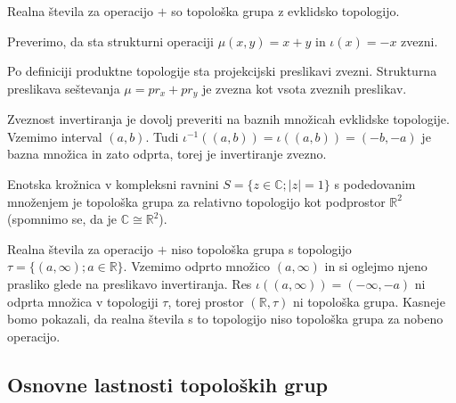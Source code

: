 \documentclass[mat1]{fmfdelo}
\newcommand{\R}{\mathbb R}
\newcommand{\C}{\mathbb C}
\begin{document}
\begin{primer}
	Realna števila za operacijo $+$ so topološka grupa z evklidsko topologijo.
	
	Preverimo, da sta strukturni operaciji $\mu(x, y) = x + y$ in $\iota(x) = -x$ zvezni.
	
	Po definiciji produktne topologije sta projekcijski preslikavi zvezni. Strukturna preslikava seštevanja $\mu = pr_x + pr_y$ je zvezna kot vsota zveznih preslikav.
	
	Zveznost invertiranja je dovolj preveriti na baznih množicah evklidske topologije. Vzemimo interval $(a, b)$. Tudi $\iota^{-1}((a, b)) = \iota((a, b)) = (-b, -a)$ je bazna množica in zato odprta, torej je invertiranje zvezno.
\end{primer}

\begin{primer}
	Enotska krožnica v kompleksni ravnini $S = \lbrace z \in \C ; |z| = 1 \rbrace$ s podedovanim množenjem je topološka grupa za relativno topologijo kot podprostor $\R^2$ (spomnimo se, da je $\C \cong \R^2$).
\end{primer}

\begin{primer}\label{pri:haus}
	Realna števila za operacijo $+$ niso topološka grupa s topologijo $\tau = \lbrace (a, \infty) ; a \in \R \rbrace$. Vzemimo odprto množico $(a, \infty)$ in si oglejmo njeno prasliko glede na preslikavo invertiranja. Res $\iota((a, \infty)) = (-\infty, -a)$ ni odprta množica v topologiji $\tau$, torej prostor $(\R, \tau)$ ni topološka grupa. Kasneje bomo pokazali, da realna števila s to topologijo niso topološka grupa za nobeno operacijo.
%	
\end{primer}

\subsection{Osnovne lastnosti topoloških grup}
\end{document}
